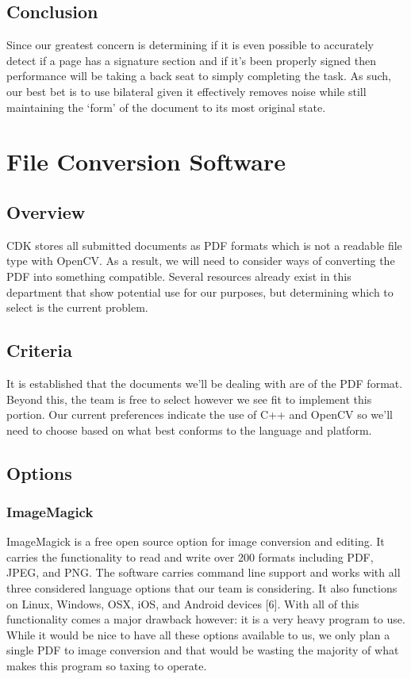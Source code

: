 \documentclass[onecolumn, draftclsnofoot,10pt, compsoc]{IEEEtran}
\begin{document}
\subsection{Conclusion}
Since our greatest concern is determining if it is even possible to accurately detect if a page has a signature section and if it’s been properly signed then performance will be taking a back seat to simply completing the task. As such, our best bet is to use bilateral given it effectively removes noise while still maintaining the ‘form’ of the document to its most original state.

\section{File Conversion Software}
\subsection{Overview}
CDK stores all submitted documents as PDF formats which is not a readable file type with OpenCV. As a result, we will need to consider ways of converting the PDF into something compatible. Several resources already exist in this department that show potential use for our purposes, but determining which to select is the current problem.

\subsection{Criteria}
It is established that the documents we’ll be dealing with are of the PDF format. Beyond this, the team is free to select however we see fit to implement this portion. Our current preferences indicate the use of C++ and OpenCV so we’ll need to choose based on what best conforms to the language and platform.

\subsection{Options}
\subsubsection{ImageMagick}
ImageMagick is a free open source option for image conversion and editing. It carries the functionality to read and write over 200 formats including PDF, JPEG, and PNG. The software carries command line support and works with all three considered language options that our team is considering. It also functions on Linux, Windows, OSX, iOS, and Android devices [6]. With all of this functionality comes a major drawback however: it is a very heavy program to use. While it would be nice to have all these options available to us, we only plan a single PDF to image conversion and that would be wasting the majority of what makes this program so taxing to operate.
\end{document}
